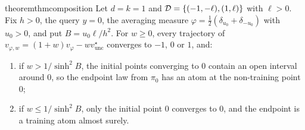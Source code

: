 \documentclass{article} %
\theoremstyle{plain}
\theoremstyle{definition}
\theoremstyle{remark}
\begin{document}
\begin{restatable}{theorem}{thmcomposition}
\label{thm:composition}
Let $d=k=1$ and $\mathcal{D}=\{(-1,-\ell),(1,\ell)\}$ with $\ell>0$. Fix $h>0$, the query $y=0$, the
averaging measure $\varphi=\tfrac12(\delta_{u_0}+\delta_{-u_0})$ with $u_0>0$, and put
$B=u_0\ell/h^2$. For $w\ge0$, every trajectory of
$v_{\varphi,w}=(1+w)v_\varphi-wv_{\mathrm{unc}}^\star$ converges to $-1$, $0$ or $1$, and:
\begin{enumerate}[label=(\alph*),leftmargin=2em]
\item if $w>1/\sinh^2B$, the initial points converging to $0$ contain an open interval around
  $0$, so the endpoint law from $\pi_0$ has an atom at the non-training point $0$;
\item if $w\le1/\sinh^2B$, only the initial point $0$ converges to $0$, and the endpoint is a
  training atom almost surely.
\end{enumerate}
\end{restatable}
\end{document}
